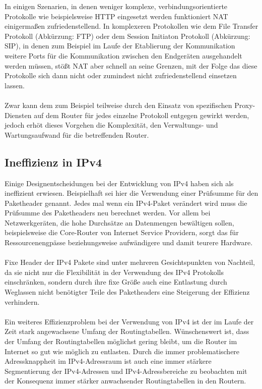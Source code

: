 \documentclass[a4paper,12pt]{scrartcl}
\begin{document}
In einigen Szenarien, in denen weniger komplexe, verbindungsorientierte Protokolle wie beispielsweise HTTP eingesetzt werden funktioniert NAT einigerma\ss{}en zufriedenstellend. In komplexeren Protokollen wie dem File Transfer Protokoll (Abk\"urzung: FTP) oder dem Session Initiaton Protokoll (Abk\"urzung: SIP), in denen zum Beispiel im Laufe der Etablierung der Kommunikation weitere Ports f\"ur die Kommunikation zwischen den Endger\"aten ausgehandelt werden m\"ussen, st\"o{\ss}t NAT aber schnell an seine Grenzen, mit der Folge das diese Protokolle sich dann nicht oder zumindest nicht zufriedenstellend einsetzen lassen.\\
\\
Zwar kann dem zum Beispiel teilweise durch den Einsatz von spezifischen Proxy-Diensten auf dem Router f\"ur jedes einzelne Protokoll entgegen gewirkt werden, jedoch erh\"ot dieses Vorgehen die Komplexit\"at, den Verwaltungs- und Wartungsaufwand f\"ur die betreffenden Router.

\subsection{Ineffizienz in IPv4}
Einige Designentscheidungen bei der Entwicklung von IPv4 haben sich als ineffizient erwiesen. Beispielhaft sei hier die Verwendung einer Prüfsumme für den Paketheader genannt. Jedes mal wenn ein IPv4-Paket verändert wird muss die Prüfsumme des Paketheaders neu berechnet werden. Vor allem bei Netzwerkgeräten, die hohe Durchsätze an Datenmengen bewältigen sollen, beispielsweise die Core-Router von Internet Service Providern, sorgt das für Ressourcenengpässe beziehungsweise aufwändigere und damit teurere Hardware.\\
\\
Fixe Header der IPv4 Pakete sind unter mehreren Gesichtspunkten von Nachteil, da sie nicht nur die Flexibilität in der Verwendung des IPv4 Protokolls einschränken, sondern durch ihre fixe Größe auch eine Entlastung durch Weglassen nicht benötigter Teile des Paketheaders eine Steigerung der Effizienz verhindern.  \\
\\
Ein weiteres Effizienzproblem bei der Verwendung von IPv4 ist der im Laufe der Zeit stark angewachsene Umfang der Routingtabellen. Wünschenswert ist, dass der Umfang der Routingtabellen möglichst gering bleibt, um die Router im Internet so gut wie möglich zu entlasten. Durch die immer problematischere Adressknappheit im IPv4-Adressraum ist auch eine immer stärkere Segmentierung der IPv4-Adressen und IPv4-Adressbereiche zu beobachten mit der Konsequenz immer stärker anwachsender Routingtabellen in den Routern.\\
\end{document}
